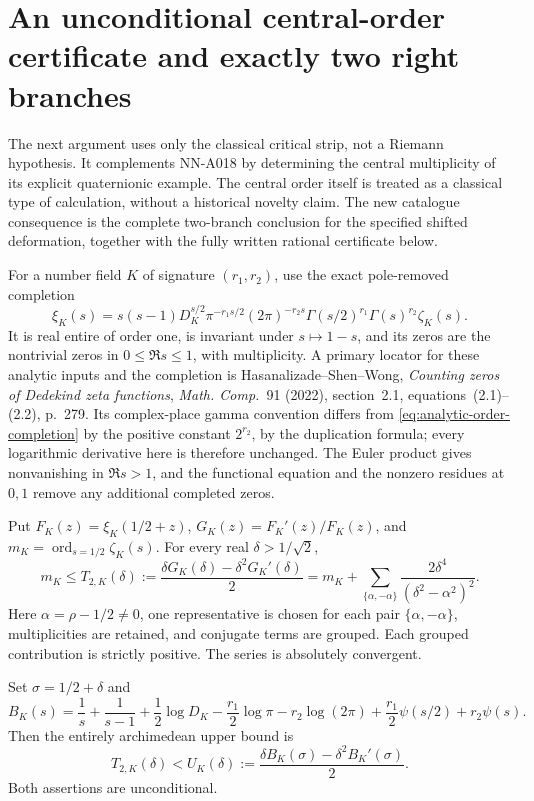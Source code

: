 \section{An unconditional central-order certificate and exactly two right branches}
\label{sec:analytic-central-order-certificate}

The next argument uses only the classical critical strip, not a
Riemann hypothesis. It complements NN-A018 by determining the
central multiplicity of its explicit quaternionic example.
The central order itself is treated as a classical type of
calculation, without a historical novelty claim. The new
catalogue consequence is the complete two-branch conclusion for
the specified shifted deformation, together with the fully
written rational certificate below.

For a number field $K$ of signature $(r_1,r_2)$, use the exact
pole-removed completion
\begin{equation}\label{eq:analytic-order-completion}
 \xi_K(s)=s(s-1)D_K^{s/2}\pi^{-r_1s/2}(2\pi)^{-r_2s}
        \Gamma(s/2)^{r_1}\Gamma(s)^{r_2}\zeta_K(s).
\end{equation}
It is real entire of order one, is invariant under $s\mapsto1-s$,
and its zeros are the nontrivial zeros in $0\le\Re s\le1$,
with multiplicity. A primary locator for these analytic inputs
and the completion is Hasanalizade--Shen--Wong,
\emph{Counting zeros of Dedekind zeta functions},
\emph{Math. Comp.}~91 (2022), section~2.1, equations~(2.1)--(2.2),
p.~279. Its complex-place gamma convention differs from
\eqref{eq:analytic-order-completion} by the positive constant
$2^{r_2}$, by the duplication formula; every logarithmic
derivative here is therefore unchanged. The Euler product gives
nonvanishing in $\Re s>1$, and the functional equation and the
nonzero residues at $0,1$ remove any additional completed zeros.

\begin{theorem}
\label{thm:analytic-central-order-test}
Put $F_K(z)=\xi_K(1/2+z)$,
$G_K(z)=F_K'(z)/F_K(z)$, and
$m_K=\operatorname{ord}_{s=1/2}\zeta_K(s)$. For every real
$\delta>1/\sqrt2$,
\begin{equation}\label{eq:analytic-T2-order}
 m_K\le T_{2,K}(\delta):=
 \frac{\delta G_K(\delta)-\delta^2G_K'(\delta)}2
 =m_K+\sum_{\{\alpha,-\alpha\}}
                 \frac{2\delta^4}{(\delta^2-\alpha^2)^2}.
\end{equation}
Here $\alpha=\rho-1/2\ne0$, one representative is chosen for
each pair $\{\alpha,-\alpha\}$, multiplicities are retained,
and conjugate terms are grouped. Each grouped contribution is
strictly positive. The series is absolutely convergent.

Set $\sigma=1/2+\delta$ and
\[
 B_K(s)=\frac1s+\frac1{s-1}+\frac12\log D_K
       -\frac{r_1}2\log\pi-r_2\log(2\pi)
       +\frac{r_1}2\psi(s/2)+r_2\psi(s).
\]
Then the entirely archimedean upper bound is
\begin{equation}\label{eq:analytic-T2-arch}
 T_{2,K}(\delta)<
 U_K(\delta):=
       \frac{\delta B_K(\sigma)-\delta^2B_K'(\sigma)}2.
\end{equation}
Both assertions are unconditional.
\end{theorem}

